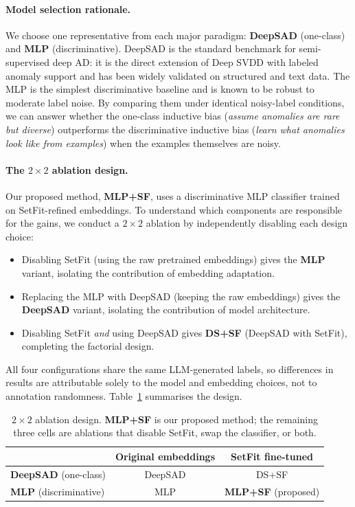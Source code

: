 \documentclass[12pt]{article}
\begin{document}
\paragraph{Model selection rationale.}
We choose one representative from each major paradigm: 
\textbf{DeepSAD} (one-class) and \textbf{MLP} (discriminative). 
DeepSAD is the standard benchmark for semi-supervised deep AD: it is the 
direct extension of Deep SVDD with labeled anomaly support and has been 
widely validated on structured and text data. The MLP is the simplest 
discriminative baseline and is known to be robust to moderate label noise. 
By comparing them under identical noisy-label conditions, we can answer 
whether the one-class inductive bias (\emph{assume anomalies are rare but diverse}) 
outperforms the discriminative inductive bias 
(\emph{learn what anomalies look like from examples}) when the examples themselves 
are noisy.

\paragraph{The $2 \times 2$ ablation design.}
Our proposed method, \textbf{MLP+SF}, uses a discriminative MLP classifier 
trained on SetFit-refined embeddings. To understand which components are 
responsible for the gains, we conduct a $2 \times 2$ ablation by 
independently disabling each design choice:
\begin{itemize}
    \item Disabling SetFit (using the raw pretrained embeddings) gives the 
          \textbf{MLP} variant, isolating the contribution of embedding 
          adaptation.
    \item Replacing the MLP with DeepSAD (keeping the raw embeddings) gives 
          the \textbf{DeepSAD} variant, isolating the contribution of model 
          architecture.
    \item Disabling SetFit \emph{and} using DeepSAD gives \textbf{DS+SF} 
          (DeepSAD with SetFit), completing the factorial design.
\end{itemize}
All four configurations share the same LLM-generated labels, so differences 
in results are attributable solely to the model and embedding choices, not 
to annotation randomness. Table~\ref{tab:2x2-design} summarises the design.

\renewcommand{\arraystretch}{1.0}
\begin{table}[ht]
\small
\centering
\caption{$2 \times 2$ ablation design. \textbf{MLP+SF} is our proposed method; 
         the remaining three cells are ablations that disable SetFit, 
         swap the classifier, or both.}
\label{tab:2x2-design}
\begin{tabular}{lcc}
\toprule
 & \textbf{Original embeddings} & \textbf{SetFit fine-tuned} \\
\midrule
\textbf{DeepSAD} (one-class)  & DeepSAD      & DS+SF \\
\textbf{MLP} (discriminative) & MLP          & \textbf{MLP+SF} (proposed) \\
\bottomrule
\end{tabular}
\end{table}
\end{document}
